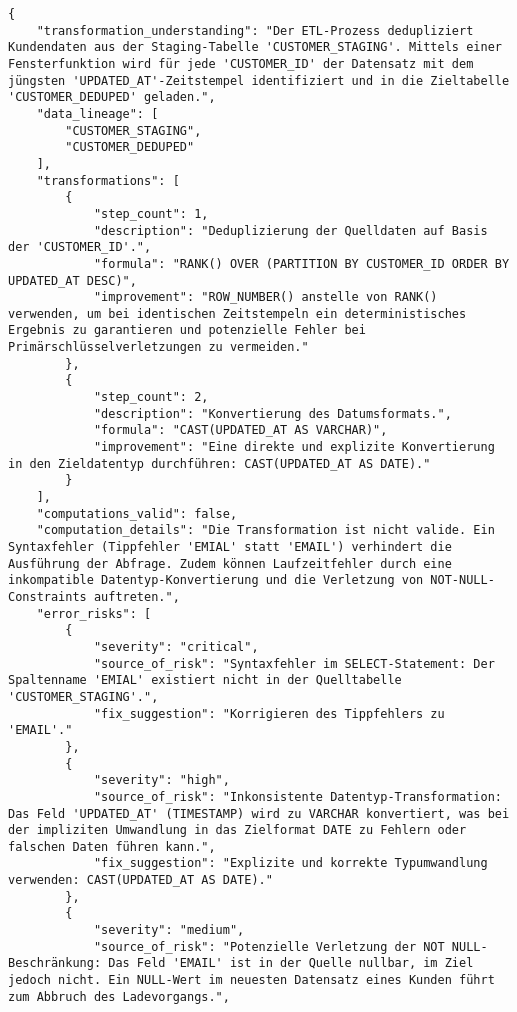 \begin{lstlisting}[caption={Ausgabe: GEMINI 2.5 Pro Anwendungsfall 2 Hauptdurchlauf},label={gemini_case2_prompt1}]
{
    "transformation_understanding": "Der ETL-Prozess dedupliziert Kundendaten aus der Staging-Tabelle 'CUSTOMER_STAGING'. Mittels einer Fensterfunktion wird für jede 'CUSTOMER_ID' der Datensatz mit dem jüngsten 'UPDATED_AT'-Zeitstempel identifiziert und in die Zieltabelle 'CUSTOMER_DEDUPED' geladen.",
    "data_lineage": [
        "CUSTOMER_STAGING",
        "CUSTOMER_DEDUPED"
    ],
    "transformations": [
        {
            "step_count": 1,
            "description": "Deduplizierung der Quelldaten auf Basis der 'CUSTOMER_ID'.",
            "formula": "RANK() OVER (PARTITION BY CUSTOMER_ID ORDER BY UPDATED_AT DESC)",
            "improvement": "ROW_NUMBER() anstelle von RANK() verwenden, um bei identischen Zeitstempeln ein deterministisches Ergebnis zu garantieren und potenzielle Fehler bei Primärschlüsselverletzungen zu vermeiden."
        },
        {
            "step_count": 2,
            "description": "Konvertierung des Datumsformats.",
            "formula": "CAST(UPDATED_AT AS VARCHAR)",
            "improvement": "Eine direkte und explizite Konvertierung in den Zieldatentyp durchführen: CAST(UPDATED_AT AS DATE)."
        }
    ],
    "computations_valid": false,
    "computation_details": "Die Transformation ist nicht valide. Ein Syntaxfehler (Tippfehler 'EMIAL' statt 'EMAIL') verhindert die Ausführung der Abfrage. Zudem können Laufzeitfehler durch eine inkompatible Datentyp-Konvertierung und die Verletzung von NOT-NULL-Constraints auftreten.",
    "error_risks": [
        {
            "severity": "critical",
            "source_of_risk": "Syntaxfehler im SELECT-Statement: Der Spaltenname 'EMIAL' existiert nicht in der Quelltabelle 'CUSTOMER_STAGING'.",
            "fix_suggestion": "Korrigieren des Tippfehlers zu 'EMAIL'."
        },
        {
            "severity": "high",
            "source_of_risk": "Inkonsistente Datentyp-Transformation: Das Feld 'UPDATED_AT' (TIMESTAMP) wird zu VARCHAR konvertiert, was bei der impliziten Umwandlung in das Zielformat DATE zu Fehlern oder falschen Daten führen kann.",
            "fix_suggestion": "Explizite und korrekte Typumwandlung verwenden: CAST(UPDATED_AT AS DATE)."
        },
        {
            "severity": "medium",
            "source_of_risk": "Potenzielle Verletzung der NOT NULL-Beschränkung: Das Feld 'EMAIL' ist in der Quelle nullbar, im Ziel jedoch nicht. Ein NULL-Wert im neuesten Datensatz eines Kunden führt zum Abbruch des Ladevorgangs.",

\end{lstlisting}
